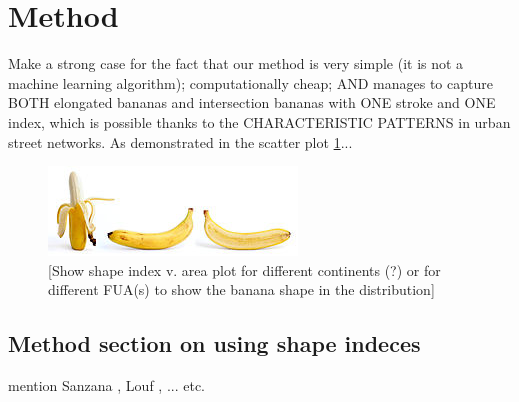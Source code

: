 \section{Method}
\label{sec:method}

Make a strong case for the fact that our method is very simple (it is not a machine learning algorithm); computationally cheap; AND manages to capture BOTH elongated bananas and intersection bananas with ONE stroke and ONE index, which is possible thanks to the CHARACTERISTIC PATTERNS in urban street networks. As demonstrated in the scatter plot \ref{fig:banana-scatter}...

\begin{figure}
    \centering
    \includegraphics{figures/banana}
    \caption{[Show shape index v. area plot for different continents (?) or for different FUA(s) to show the banana shape in the distribution]}
    \label{fig:banana-scatter}
\end{figure}


\subsection*{Method section on using shape indeces}
mention Sanzana \cite{sanzana_decomposition_2018}, Louf \cite{louf_typology_2014}, ... etc.


